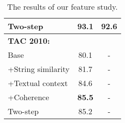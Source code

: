 \documentclass[11pt,letterpaper]{article}
\begin{document}
\begin{table}[t]
\begin{tabular}{p{2.8cm}|cc}
\small{Two-step} & \textbf{93.1} & \textbf{92.6} \\
\hline
\textbf{TAC 2010:} \\
\hline
\small{Base} & 80.1 & - \\
\small{+String similarity} & 81.7 & - \\
\small{+Textual context} & 84.6 & - \\
\small{+Coherence} & \textbf{85.5} & - \\
\small{Two-step} & 85.2 & - \\
\hline
\end{tabular}
\caption{The results of our feature study.}
\label{tb:feature-study}
\end{table}
\end{document}
